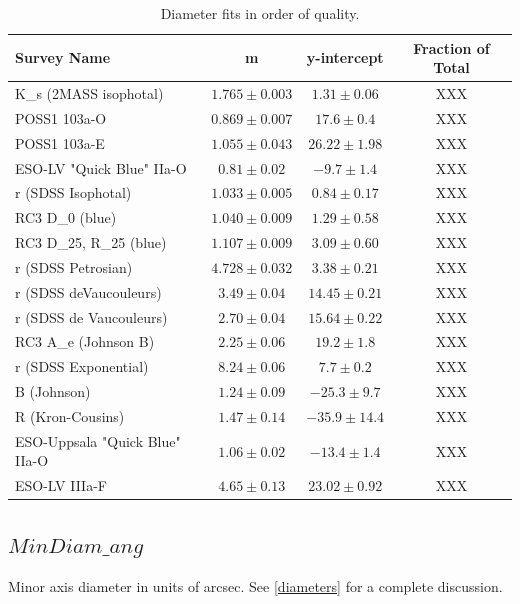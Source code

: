 \documentclass[iop]{emulateapj-rtx4}
\begin{document}
\begin{table}[ht]\footnotesize
\begin{center}
\begin{tabular}{l c c c}
 \hline \hline
 Survey Name                			& m   				& y-intercept			& Fraction of Total	\\
  \hline \hline 
K\_s (2MASS isophotal)			& $1.765 \pm 0.003$		& $1.31 \pm 0.06$		&	XXX			\\
POSS1 103a-O					& $0.869 \pm  0.007$	& $17.6 \pm 0.4$		&      XXX			\\
POSS1 103a-E					& $1.055 \pm 0.043$		& $26.22 \pm 1.98$		&	XXX			\\
ESO-LV "Quick Blue" IIa-O		& $0.81 \pm 0.02$		& $-9.7 \pm 1.4$		&	XXX			\\
r (SDSS Isophotal)				& $1.033 \pm 0.005$		& $0.84 \pm 0.17$		&	XXX			\\
RC3 D\_0 (blue)				& $1.040 \pm 0.009$		& $1.29 \pm 0.58$		&	XXX			\\
RC3 D\_25, R\_25 (blue)			& $1.107 \pm 0.009$		& $3.09 \pm 0.60$		&	XXX			\\
r (SDSS Petrosian)				& $4.728 \pm 0.032$		& $3.38 \pm 0.21$		&	XXX			\\
r (SDSS deVaucouleurs)			& $3.49 \pm 0.04$		& $14.45 \pm 0.21$		&	XXX			\\
r (SDSS de Vaucouleurs)			& $2.70 \pm 0.04$		& $15.64 \pm 0.22$		&	XXX			\\
RC3 A\_e (Johnson B)			& $2.25 \pm 0.06$		& $19.2 \pm 1.8$		&	XXX			\\
r (SDSS Exponential)			& $8.24 \pm 0.06$		& $7.7 \pm 0.2$		&	XXX			\\
B (Johnson)					& $1.24 \pm 0.09$		& $-25.3 \pm 9.7$		&	XXX			\\
R (Kron-Cousins)				& $1.47 \pm 0.14$		& $-35.9 \pm 14.4$		&	XXX			\\
ESO-Uppsala "Quick Blue" IIa-O	& $1.06 \pm 0.02$		& $-13.4 \pm 1.4$		&	XXX			\\
ESO-LV IIIa-F					& $4.65 \pm 0.13$		& $23.02 \pm 0.92$		&	XXX			\\
\hline
\end{tabular}
\end{center}
  \caption{\small{Diameter fits in order of quality.}}
  \label{diameter_fits}
\end{table}


\subsection{$MinDiam\_ang$}
Minor axis diameter in units of arcsec. See \ref{diameters} for a complete discussion.
\end{document}
